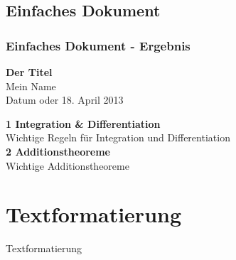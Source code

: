 \documentclass{beamer}
\begin{document}
\subsection{Einfaches Dokument}
\begin{frame}
 \frametitle{Einfaches Dokument - Ergebnis}
  \begin{center}
  \huge \textbf{Der Titel}\\
  \vspace{1ex}
  \normalsize Mein Name\\
  \vspace{1ex}
  Datum oder 18. April 2013\\
  \end{center}
\textbf{1 Integration \& Differentiation}\\
\vspace{1ex}
\scriptsize Wichtige Regeln für Integration und Differentiation\\
\vspace{1.5ex}
\normalsize \textbf{2 Additionstheoreme}\\
\scriptsize Wichtige Additionstheoreme
\end{frame}


\section{Textformatierung}
\begin{frame}
 \begin{center}
  \Huge Textformatierung
 \end{center}
\end{frame}
\end{document}
